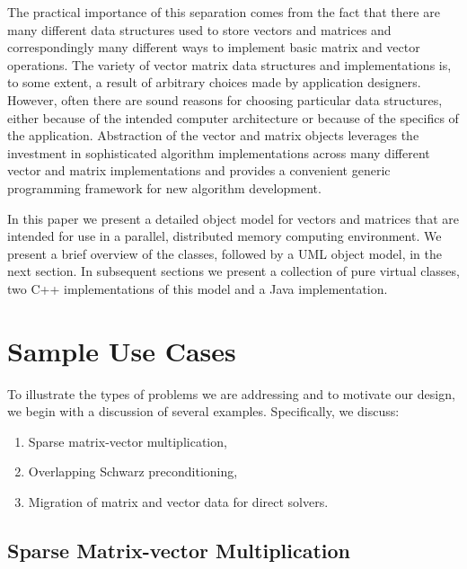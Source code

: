 \documentclass[10pt,relax]{PetraObjectModel}
\begin{document}
The practical importance of this separation comes from the fact
that there are many different data structures used to store
vectors and matrices and correspondingly many different ways
to implement basic matrix and vector operations.  The variety
of vector matrix data structures and implementations is, to
some extent, a result of arbitrary choices made by application
designers.  However, often there are sound reasons for choosing
particular data structures, either because of the intended
computer architecture or because of the specifics of the
application.  Abstraction of the vector and matrix objects
leverages the investment in sophisticated algorithm implementations
across many different vector and matrix implementations and
provides a convenient generic programming framework for new
algorithm development.

In this paper we present a detailed object model for vectors
and matrices that are intended for use in a parallel, distributed
memory computing environment.  We present a brief overview of
the classes, followed by a UML object model, in the next section.
In subsequent sections we present a collection of pure virtual
classes, two C++ implementations of this model and a Java
implementation.

\section{Sample Use Cases}

To illustrate the types of problems we are addressing and to motivate
our design, we begin with a discussion of several examples.
Specifically, we discuss:
\begin{enumerate}
\item Sparse matrix-vector multiplication,
\item Overlapping Schwarz preconditioning,
\item Migration of matrix and vector data for direct solvers.
\end{enumerate}

\subsection{Sparse Matrix-vector Multiplication}
\end{document}
